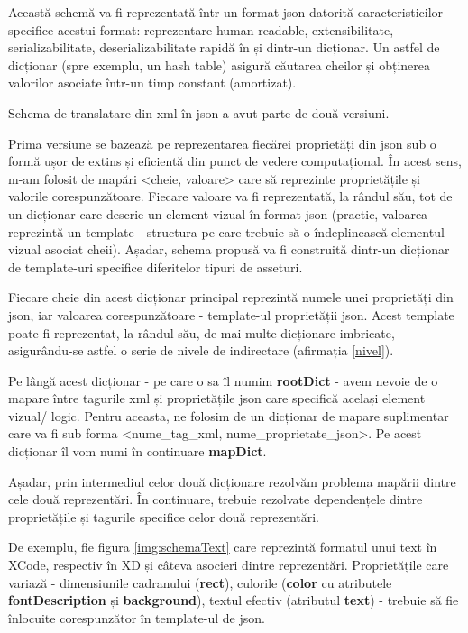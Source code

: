 Această schemă va fi reprezentată într-un format json datorită caracteristicilor specifice acestui format: reprezentare human-readable, extensibilitate, serializabilitate, deserializabilitate rapidă în și dintr-un dicționar. Un astfel de dicționar (spre exemplu, un hash table) asigură căutarea cheilor și obținerea valorilor asociate într-un timp constant (amortizat).

Schema de translatare din xml în json a avut parte de două versiuni. 

Prima versiune se bazează pe reprezentarea fiecărei proprietăți din json sub o formă ușor de extins și eficientă din punct de vedere computațional. În acest sens, m-am folosit de mapări <cheie, valoare> care să reprezinte proprietățile și valorile corespunzătoare. Fiecare valoare va fi reprezentată, la rândul său, tot de un dicționar care descrie un element vizual în format json (practic, valoarea reprezintă un template - structura pe care trebuie să o îndeplinească elementul vizual asociat cheii). Așadar, schema propusă va fi construită dintr-un dicționar de template-uri specifice diferitelor tipuri de asseturi.

Fiecare cheie din acest dicționar principal reprezintă numele unei proprietăți din json, iar valoarea corespunzătoare - template-ul proprietății json.  Acest template poate fi reprezentat, la rândul său, de mai multe dicționare imbricate, asigurându-se astfel o serie de nivele de indirectare (afirmația \ref{nivel}).

Pe lângă acest dicționar - pe care o sa îl numim \textbf{rootDict} - avem nevoie de o mapare între tagurile xml și proprietățile json care specifică același element vizual/ logic. Pentru aceasta, ne folosim de un dicționar de mapare suplimentar care va fi sub forma <nume_tag_xml,  nume_proprietate_json>. Pe acest dicționar îl vom numi în continuare \textbf{mapDict}.

Așadar, prin intermediul celor două dicționare rezolvăm problema mapării dintre cele două reprezentări. 
În continuare, trebuie rezolvate dependențele dintre proprietățile și tagurile specifice celor două reprezentări.




De exemplu, fie figura \ref{img:schemaText} care reprezintă formatul unui text în XCode, respectiv în XD și câteva asocieri dintre reprezentări.
Proprietățile care variază - dimensiunile cadranului (\textbf{rect}), culorile (\textbf{color} cu atributele \textbf{fontDescription} și \textbf{background}), textul efectiv (atributul \textbf{text}) - trebuie să fie înlocuite corespunzător în template-ul de json.


